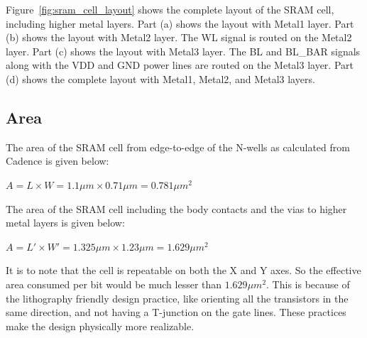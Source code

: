 \documentclass[10pt,letterpaper,onecolumn]{article}
\begin{document}
Figure~\ref{fig:sram_cell_layout} shows the complete layout of the SRAM cell, including higher metal layers. Part (a) shows the layout with Metal1 layer. Part (b) shows the layout with Metal2 layer. The WL signal is routed on the Metal2 layer. Part (c) shows the layout with Metal3 layer. The BL and BL\_BAR signals along with the VDD and GND power lines are routed on the Metal3 layer. Part (d) shows the complete layout with Metal1, Metal2, and Metal3 layers. 

\subsection{Area}
The area of the SRAM cell from edge-to-edge of the N-wells as calculated from Cadence is given below:
\begin{center}
$A = L\times W = 1.1 \mu m\times 0.71 \mu m = 0.781 \mu m^2$
\end{center}
The area of the SRAM cell including the body contacts and the vias to higher metal layers is given below:
\begin{center}
$A = L'\times W' = 1.325 \mu m \times 1.23 \mu m = 1.629 \mu m^2$ 
\end{center}
It is to note that the cell is repeatable on both the X and Y axes. So the effective area consumed per bit would be much lesser than $1.629 \mu m^2$. This is because of the lithography friendly design practice, like orienting all the transistors in the same direction, and not having a T-junction on the gate lines. These practices make the design physically more realizable. 
\end{document}
